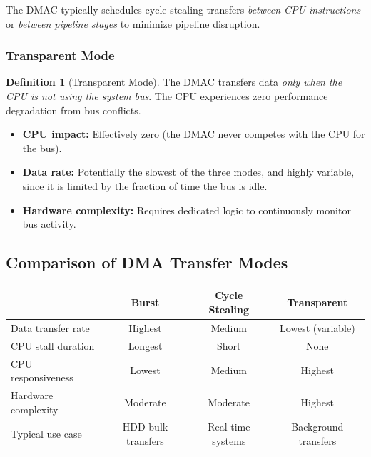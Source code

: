 \documentclass[11pt, a4paper, notitlepage]{report}
\theoremstyle{definition}
\newtheorem{definition}[theorem]{Definition}
\theoremstyle{remark}
\theoremstyle{definition}
\begin{document}
The DMAC typically schedules cycle-stealing transfers \emph{between CPU instructions} or \emph{between pipeline stages} to minimize pipeline disruption.

\subsubsection{Transparent Mode}

\begin{definition}[Transparent Mode]
  \label{def:transparent}
  The DMAC transfers data \emph{only when the CPU is not using the system bus}. The CPU experiences zero performance degradation from bus conflicts.
\end{definition}

\begin{itemize}
  \item \textbf{CPU impact:} Effectively zero (the DMAC never competes with the CPU for the bus).
  \item \textbf{Data rate:} Potentially the slowest of the three modes, and highly variable, since it is limited by the fraction of time the bus is idle.
  \item \textbf{Hardware complexity:} Requires dedicated logic to continuously monitor bus activity.
\end{itemize}

\subsection{Comparison of DMA Transfer Modes}
\label{sec:dma-comparison}

\begin{center}
\renewcommand{\arraystretch}{1.4}
\begin{tabular}{lccc}
  \toprule
  & \textbf{Burst} & \textbf{Cycle Stealing} & \textbf{Transparent} \\
  \midrule
  Data transfer rate     & Highest  & Medium   & Lowest (variable) \\
  CPU stall duration     & Longest  & Short    & None \\
  CPU responsiveness     & Lowest   & Medium   & Highest \\
  Hardware complexity    & Moderate & Moderate & Highest \\
  Typical use case       & HDD bulk transfers & Real-time systems & Background transfers \\
  \bottomrule
\end{tabular}
\end{center}
\end{document}

